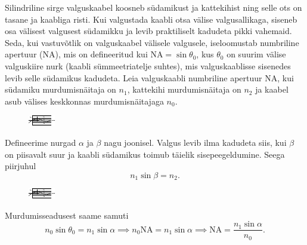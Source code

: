 
Silindriline sirge valguskaabel koosneb südamikust ja kattekihist ning selle ots on tasane ja kaabliga risti. Kui valgustada kaabli otsa välise valgusallikaga, siseneb osa välisest valgusest südamikku ja levib praktiliselt kadudeta pikki vahemaid. Seda, kui vastuvõtlik on valguskaabel välisele valgusele, iseloomustab numbriline apertuur (NA), mis on defineeritud kui $\text{NA} = \sin \theta_0$, kus $\theta_0$ on suurim välise valguskiire nurk (kaabli sümmeetriatelje suhtes), mis valguskaablisse sisenedes levib selle südamikus kadudeta. Leia valguskaabli numbriline apertuur NA, kui südamiku murdumisnäitaja on $n_1$, kattekihi murdumisnäitaja on $n_2$ ja kaabel asub välises keskkonnas murdumisnäitajaga $n_0$.
\begin{figure}[h]
    \centering
    \includegraphics[width=.7\linewidth]{2024-lahg-03-yl.pdf}
\end{figure}




\hint

\solu
Defineerime nurgad $\alpha$ ja $\beta$ nagu joonisel. Valgus levib ilma kadudeta siis, kui $\beta$ on piisavalt suur ja kaabli südamikus toimub täielik sisepeegeldumine. Seega piirjuhul
\begin{equation*}
    n_1 \sin \beta = n_2.
\end{equation*}

\begin{figure}[h]
    \centering
    \includegraphics[width=.7\linewidth]{2024-lahg-03-yl.pdf}
\end{figure}

Murdumisseadusest saame samuti
\begin{equation*}
    n_0 \sin \theta_0 = n_1 \sin \alpha \implies n_0 \text{NA} = n_1 \sin \alpha \implies \text{NA} = \frac{n_1 \sin \alpha}{n_0}.
\end{equation*}

